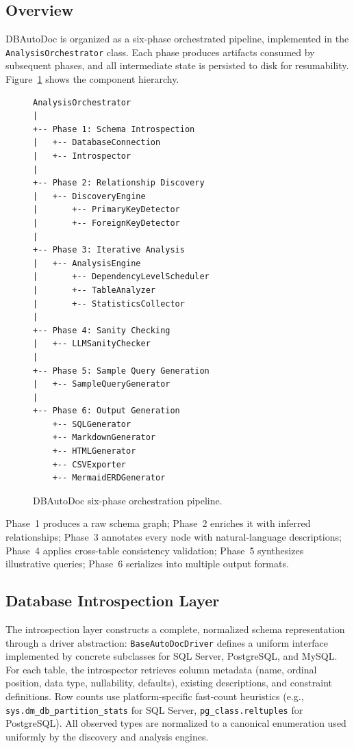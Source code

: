 \documentclass[sigconf, nonacm]{acmart}
\begin{document}
\subsection{Overview}

DBAutoDoc is organized as a six-phase orchestrated pipeline, implemented in the \texttt{AnalysisOrchestrator} class. Each phase produces artifacts consumed by subsequent phases, and all intermediate state is persisted to disk for resumability. Figure~\ref{fig:pipeline} shows the component hierarchy.

\begin{figure}[t]
\begin{small}
\begin{verbatim}
AnalysisOrchestrator
|
+-- Phase 1: Schema Introspection
|   +-- DatabaseConnection
|   +-- Introspector
|
+-- Phase 2: Relationship Discovery
|   +-- DiscoveryEngine
|       +-- PrimaryKeyDetector
|       +-- ForeignKeyDetector
|
+-- Phase 3: Iterative Analysis
|   +-- AnalysisEngine
|       +-- DependencyLevelScheduler
|       +-- TableAnalyzer
|       +-- StatisticsCollector
|
+-- Phase 4: Sanity Checking
|   +-- LLMSanityChecker
|
+-- Phase 5: Sample Query Generation
|   +-- SampleQueryGenerator
|
+-- Phase 6: Output Generation
    +-- SQLGenerator
    +-- MarkdownGenerator
    +-- HTMLGenerator
    +-- CSVExporter
    +-- MermaidERDGenerator
\end{verbatim}
\end{small}
\caption{DBAutoDoc six-phase orchestration pipeline.}
\label{fig:pipeline}
\end{figure}

Phase~1 produces a raw schema graph; Phase~2 enriches it with inferred relationships; Phase~3 annotates every node with natural-language descriptions; Phase~4 applies cross-table consistency validation; Phase~5 synthesizes illustrative queries; Phase~6 serializes into multiple output formats.

\subsection{Database Introspection Layer}

The introspection layer constructs a complete, normalized schema representation through a driver abstraction: \texttt{BaseAutoDocDriver} defines a uniform interface implemented by concrete subclasses for SQL Server, PostgreSQL, and MySQL. For each table, the introspector retrieves column metadata (name, ordinal position, data type, nullability, defaults), existing descriptions, and constraint definitions. Row counts use platform-specific fast-count heuristics (e.g., \texttt{sys.dm\_db\_partition\_stats} for SQL Server, \texttt{pg\_class.reltuples} for PostgreSQL). All observed types are normalized to a canonical enumeration used uniformly by the discovery and analysis engines.
\end{document}

